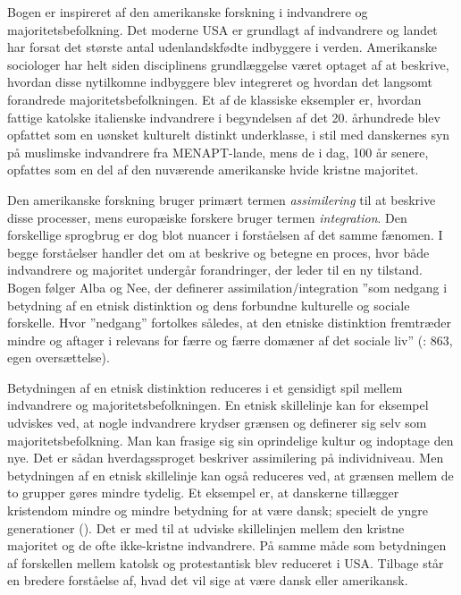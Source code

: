 \documentclass[
]{book}
\begin{document}
Bogen er inspireret af den amerikanske forskning i indvandrere og majoritetsbefolkning. Det moderne USA er grundlagt af indvandrere og landet har forsat det største antal udenlandskfødte indbyggere i verden. Amerikanske sociologer har helt siden disciplinens grundlæggelse været optaget af at beskrive, hvordan disse nytilkomne indbyggere blev integreret og hvordan det langsomt forandrede majoritetsbefolkningen. Et af de klassiske eksempler er, hvordan fattige katolske italienske indvandrere i begyndelsen af det 20. århundrede blev opfattet som en uønsket kulturelt distinkt underklasse, i stil med danskernes syn på muslimske indvandrere fra MENAPT-lande, mens de i dag, 100 år senere, opfattes som en del af den nuværende amerikanske hvide kristne majoritet.

Den amerikanske forskning bruger primært termen \emph{assimilering} til at beskrive disse processer, mens europæiske forskere bruger termen \emph{integration}. Den forskellige sprogbrug er dog blot nuancer i forståelsen af det samme fænomen. I begge forståelser handler det om at beskrive og betegne en proces, hvor både indvandrere og majoritet undergår forandringer, der leder til en ny tilstand. Bogen følger Alba og Nee, der definerer assimilation/integration ''som nedgang i betydning af en etnisk distinktion og dens forbundne kulturelle og sociale forskelle. Hvor ''nedgang'' fortolkes således, at den etniske distinktion fremtræder mindre og aftager i relevans for færre og færre domæner af det sociale liv'' (: 863, egen oversættelse).

Betydningen af en etnisk distinktion reduceres i et gensidigt spil mellem indvandrere og majoritetsbefolkningen. En etnisk skillelinje kan for eksempel udviskes ved, at nogle indvandrere krydser grænsen og definerer sig selv som majoritetsbefolkning. Man kan frasige sig sin oprindelige kultur og indoptage den nye. Det er sådan hverdagssproget beskriver assimilering på individniveau. Men betydningen af en etnisk skillelinje kan også reduceres ved, at grænsen mellem de to grupper gøres mindre tydelig. Et eksempel er, at danskerne tillægger kristendom mindre og mindre betydning for at være dansk; specielt de yngre generationer (). Det er med til at udviske skillelinjen mellem den kristne majoritet og de ofte ikke-kristne indvandrere. På samme måde som betydningen af forskellen mellem katolsk og protestantisk blev reduceret i USA. Tilbage står en bredere forståelse af, hvad det vil sige at være dansk eller amerikansk.
\end{document}
